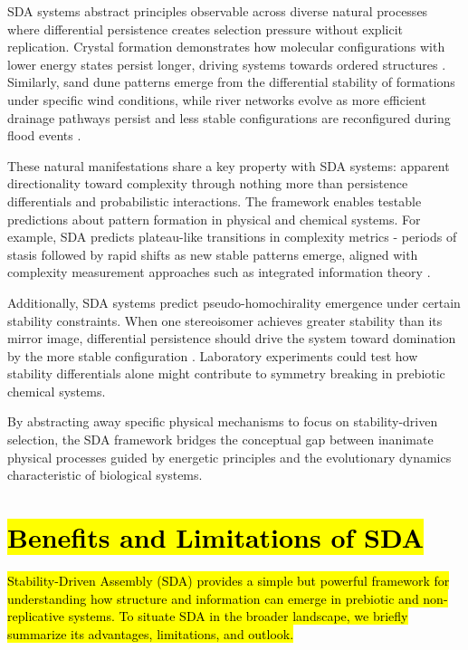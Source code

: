 \documentclass[preprint,12pt]{elsarticle}
\newcommand{\added}[1]{\hl{#1}}
\begin{document}
SDA systems abstract principles observable across diverse natural processes where differential persistence creates selection pressure without explicit replication. Crystal formation demonstrates how molecular configurations with lower energy states persist longer, driving systems towards ordered structures \cite{ball1999self}. Similarly, sand dune patterns emerge from the differential stability of formations under specific wind conditions, while river networks evolve as more efficient drainage pathways persist and less stable configurations are reconfigured during flood events \cite{kelso1997dynamic}.

These natural manifestations share a key property with SDA systems: apparent directionality toward complexity through nothing more than persistence differentials and probabilistic interactions. The framework enables testable predictions about pattern formation in physical and chemical systems. For example, SDA predicts plateau-like transitions in complexity metrics - periods of stasis followed by rapid shifts as new stable patterns emerge, aligned with complexity measurement approaches such as integrated information theory \cite{tononi2008phi}.

Additionally, SDA systems predict pseudo-homochirality emergence under certain stability constraints. When one stereoisomer achieves greater stability than its mirror image, differential persistence should drive the system toward domination by the more stable configuration \cite{blackmond2010chiral}. Laboratory experiments could test how stability differentials alone might contribute to symmetry breaking in prebiotic chemical systems.

By abstracting away specific physical mechanisms to focus on stability-driven selection, the SDA framework bridges the conceptual gap between inanimate physical processes guided by energetic principles and the evolutionary dynamics characteristic of biological systems.

\section{\added{Benefits and Limitations of SDA}}
\label{sec:benefits-limitations}

\added{
Stability-Driven Assembly (SDA) provides a simple but powerful framework for
understanding how structure and information can emerge in prebiotic and
non-replicative systems. To situate SDA in the broader landscape, we briefly
summarize its advantages, limitations, and outlook.
}
\end{document}
